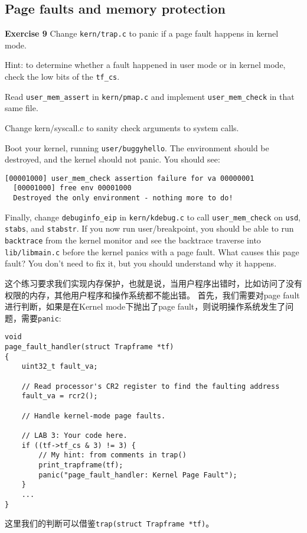 \documentclass[11pt]{article}
\begin{document}
\subsection{Page faults and memory protection}
\begin{framed}
\noindent\textbf{Exercise 9} Change \lstinline|kern/trap.c| to panic if a page fault happens in kernel mode.

Hint: to determine whether a fault happened in user mode or in kernel mode, check the low bits of the \lstinline|tf_cs|.

Read \lstinline|user_mem_assert| in \lstinline|kern/pmap.c| and implement \lstinline|user_mem_check| in that same file.

Change kern/syscall.c to sanity check arguments to system calls.

Boot your kernel, running \lstinline|user/buggyhello|. The environment should be destroyed, and the kernel should not panic. You should see:

\begin{lstlisting}[aboveskip=-1.5em,frame=none]
  [00001000] user_mem_check assertion failure for va 00000001
  [00001000] free env 00001000
  Destroyed the only environment - nothing more to do!
\end{lstlisting}

Finally, change \lstinline|debuginfo_eip| in \lstinline|kern/kdebug.c| to call \lstinline|user_mem_check| on \lstinline|usd|, \lstinline|stabs|, and \lstinline|stabstr|. If you now run user/breakpoint, you should be able to run \lstinline|backtrace| from the kernel monitor and see the backtrace traverse into \lstinline|lib/libmain.c| before the kernel panics with a page fault. What causes this page fault? You don't need to fix it, but you should understand why it happens.

\end{framed}
这个练习要求我们实现内存保护，也就是说，当用户程序出错时，比如访问了没有权限的内存，其他用户程序和操作系统都不能出错。
首先，我们需要对page fault进行判断，如果是在Kernel mode下抛出了page fault，则说明操作系统发生了问题，需要\lstinline|panic|:
\begin{lstlisting}[title=kern/trap.c]
void
page_fault_handler(struct Trapframe *tf)
{
	uint32_t fault_va;

	// Read processor's CR2 register to find the faulting address
	fault_va = rcr2();

	// Handle kernel-mode page faults.

	// LAB 3: Your code here.	
	if ((tf->tf_cs & 3) != 3) {
		// My hint: from comments in trap()
		print_trapframe(tf);
		panic("page_fault_handler: Kernel Page Fault");
	}
	...
}
\end{lstlisting}
这里我们的判断可以借鉴\lstinline|trap(struct Trapframe *tf)|。
\end{document}
